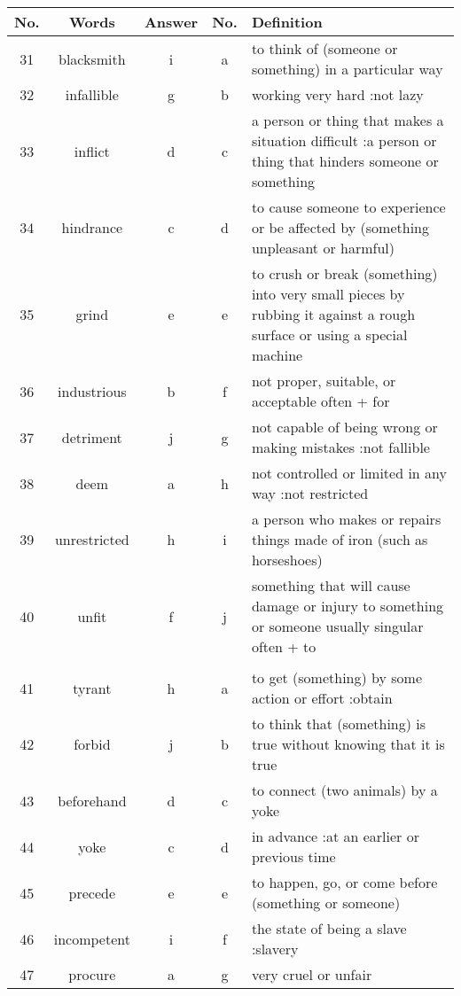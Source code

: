 \documentclass[a4paper]{article}
\begin{document}
\begin{center}
\begin{tabular}{|c|c|c|c|m{}|}
\hline
No. & Words & Answer & No. & Definition \\
\hline
 31  & blacksmith & i & a &  to think of (someone or something) in a particular way \\
\hline
 32  & infallible & g & b &  working very hard :not lazy \\
\hline
 33  & inflict & d & c &  a person or thing that makes a situation difficult :a person or thing that hinders someone or something \\
\hline
 34  & hindrance & c & d &  to cause someone to experience or be affected by (something unpleasant or harmful) \\
\hline
 35  & grind & e & e &  to crush or break (something) into very small pieces by rubbing it against a rough surface or using a special machine \\
\hline
 36  & industrious & b & f &  not proper, suitable, or acceptable often + for \\
\hline
 37  & detriment & j & g &  not capable of being wrong or making mistakes :not fallible \\
\hline
 38  & deem & a & h &  not controlled or limited in any way :not restricted \\
\hline
 39  & unrestricted & h & i &  a person who makes or repairs things made of iron (such as horseshoes)\\
\hline
 40  & unfit & f & j &  something that will cause damage or injury to something or someone usually singular often + to \\
\hline
 & & & & \\
\hline
 41  & tyrant & h & a &  to get (something) by some action or effort :obtain \\
\hline
 42  & forbid & j & b &  to think that (something) is true without knowing that it is true \\
\hline
 43  & beforehand & d & c &  to connect (two animals) by a yoke \\
\hline
 44  & yoke & c & d &  in advance :at an earlier or previous time \\
\hline
 45  & precede & e & e &  to happen, go, or come before (something or someone) \\
\hline
 46  & incompetent & i & f &  the state of being a slave :slavery \\
\hline
 47  & procure & a & g &  very cruel or unfair \\

\end{tabular}
\end{center}
\end{document}
